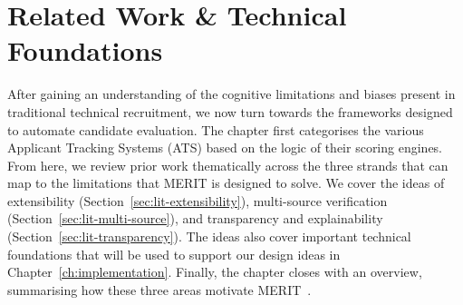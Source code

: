 \chapter{Related Work \& Technical Foundations}

After gaining an understanding of the cognitive limitations and biases present in traditional technical recruitment,
we now turn towards the frameworks designed to automate candidate evaluation.
The chapter first categorises the various Applicant Tracking Systems (ATS) based on the logic of their scoring
engines. From here, we review prior work thematically across the three strands that can map to the limitations that MERIT
is designed to solve. We cover the ideas of extensibility (Section~\ref{sec:lit-extensibility}), 
multi-source verification (Section~\ref{sec:lit-multi-source}), 
and transparency and explainability (Section~\ref{sec:lit-transparency}).
The ideas also cover important technical foundations that will be used to support our design ideas in
Chapter~\ref{ch:implementation}. Finally, the chapter closes with
an overview, summarising how these three areas motivate MERIT~\cite{merit_repo}.








